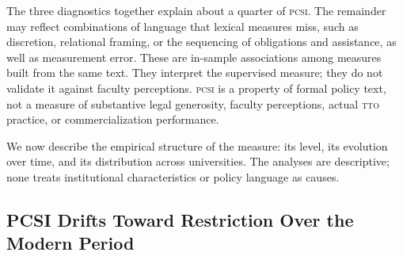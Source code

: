 The three diagnostics together explain about a quarter of \textsc{pcsi}. The remainder may reflect combinations of language that lexical measures miss, such as discretion, relational framing, or the sequencing of obligations and assistance, as well as measurement error. These are in-sample associations among measures built from the same text. They interpret the supervised measure; they do not validate it against faculty perceptions. \textsc{pcsi} is a property of formal policy text, not a measure of substantive legal generosity, faculty perceptions, actual \textsc{tto} practice, or commercialization performance.



We now describe the empirical structure of the measure: its level, its evolution over time, and its distribution across universities. The analyses are descriptive; none treats institutional characteristics or policy language as causes.





\subsection{PCSI Drifts Toward Restriction Over the Modern Period}

